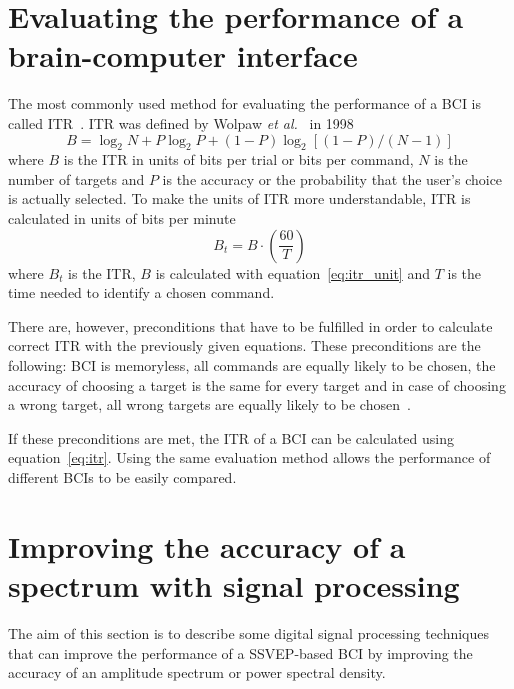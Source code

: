
\section{Evaluating the performance of a brain-computer interface}

The most commonly used method for evaluating the performance of a \gls{BCI} is called \gls{ITR}~\cite{itr}. \gls{ITR} was defined by Wolpaw \textit{et al.}~\cite{itr_wolpaw} in 1998
\begin{equation}
	\label{eq:itr_unit}
	B=\log_2 N+ P\log_2 P +(1-P)\log_2[(1-P)/(N-1)]
\end{equation}
where $B$ is the \gls{ITR} in units of bits per trial or bits per command, $N$ is the number of targets and $P$ is the accuracy or the probability that the user's choice is actually selected. To make the units of \gls{ITR} more understandable, \gls{ITR} is calculated in units of bits per minute~\cite{itr_wolpaw}
\begin{equation}
	\label{eq:itr}
	B_t=B\cdot(\frac{60}{T})
\end{equation}
where $B_t$ is the \gls{ITR}, $B$ is calculated with equation~\ref{eq:itr_unit} and $T$ is the time needed to identify a chosen command.

There are, however, preconditions that have to be fulfilled in order to calculate correct \gls{ITR} with the previously given equations. These preconditions are the following: \gls{BCI} is memoryless, all commands are equally likely to be chosen, the accuracy of choosing a target is the same for every target and in case of choosing a wrong target, all wrong targets are equally likely to be chosen~\cite{itr}.

If these preconditions are met, the \gls{ITR} of a \gls{BCI} can be calculated using equation~\ref{eq:itr}. Using the same evaluation method allows the performance of different \glspl{BCI} to be easily compared.

\section{Improving the accuracy of a spectrum with signal processing}
\label{sec:signal_processing}

The aim of this section is to describe some digital signal processing techniques that can improve the performance of a \gls{SSVEP}-based \gls{BCI} by improving the accuracy of an amplitude spectrum or \gls{power spectral density}.

